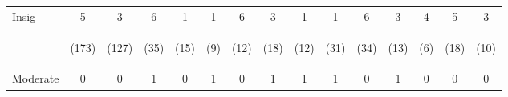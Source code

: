 \begin{tabular}{lcccccccccccccc}
\hline \noalign{\smallskip}Insig & 5 & 3 & 6 & 1 & 1 & 6 & 3 & 1 & 1 & 6 & 3 & 4 & 5 & 3\\
 & \begin{footnotesize}(173)\end{footnotesize} & \begin{footnotesize}(127)\end{footnotesize} & \begin{footnotesize}(35)\end{footnotesize} & \begin{footnotesize}(15)\end{footnotesize} & \begin{footnotesize}(9)\end{footnotesize} & \begin{footnotesize}(12)\end{footnotesize} & \begin{footnotesize}(18)\end{footnotesize} & \begin{footnotesize}(12)\end{footnotesize} & \begin{footnotesize}(31)\end{footnotesize} & \begin{footnotesize}(34)\end{footnotesize} & \begin{footnotesize}(13)\end{footnotesize} & \begin{footnotesize}(6)\end{footnotesize} & \begin{footnotesize}(18)\end{footnotesize} & \begin{footnotesize}(10)\end{footnotesize}\\
\noalign{\smallskip}Moderate & 0 & 0 & 1 & 0 & 1 & 0 & 1 & 1 & 1 & 0 & 1 & 0 & 0 & 0\\

\end{tabular}
